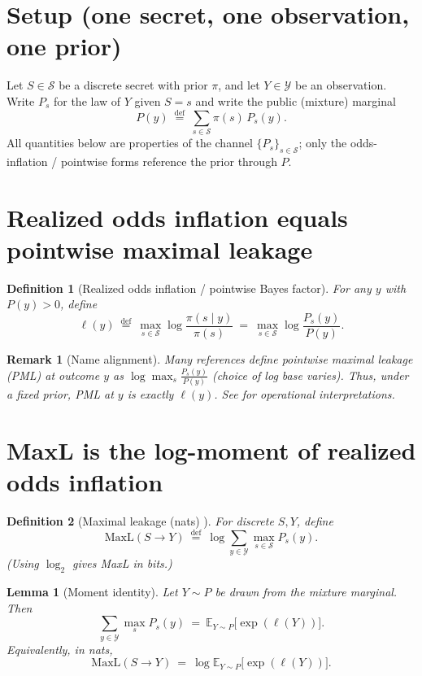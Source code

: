 \documentclass[11pt]{article}
\newcommand{\EE}{\mathbb{E}}
\newcommand{\defeq}{\stackrel{\mathrm{def}}{=}}
\newtheorem{definition}{Definition}
\newtheorem{lemma}{Lemma}
\newtheorem{remark}{Remark}
\begin{document}
\section{Setup (one secret, one observation, one prior)}
Let $S\in\mathcal S$ be a discrete secret with prior $\pi$, and let $Y\in\mathcal Y$ be an observation.
Write $P_s$ for the law of $Y$ given $S=s$ and write the public (mixture) marginal
\[
P(y)\ \defeq\ \sum_{s\in\mathcal S}\pi(s)\,P_s(y).
\]
All quantities below are properties of the channel $\{P_s\}_{s\in\mathcal S}$; only the odds-inflation / pointwise forms reference the prior through $P$.

\section{Realized odds inflation equals pointwise maximal leakage}

\begin{definition}[Realized odds inflation / pointwise Bayes factor]
For any $y$ with $P(y)>0$, define
\[
\ell(y)\ \defeq\ \max_{s\in\mathcal S}\log\frac{\pi(s\mid y)}{\pi(s)}
\ =\ \max_{s\in\mathcal S}\log\frac{P_s(y)}{P(y)}.
\]
\end{definition}

\begin{remark}[Name alignment]
Many references define \emph{pointwise maximal leakage} (PML) at outcome $y$ as
$\log\max_s \tfrac{P_s(y)}{P(y)}$ (choice of log base varies).
Thus, under a fixed prior, \emph{PML} at $y$ is exactly $\ell(y)$.
See \cite{saeidian2023pml} for operational interpretations.
\end{remark}

\section{MaxL is the log-moment of realized odds inflation}

\begin{definition}[Maximal leakage (nats) \cite{issa2020operational}]
For discrete $S,Y$, define
\[
\mathrm{MaxL}(S\to Y)\ \defeq\ \log\sum_{y\in\mathcal Y}\max_{s\in\mathcal S} P_s(y).
\]
(Using $\log_2$ gives MaxL in bits.)
\end{definition}

\begin{lemma}[Moment identity]
Let $Y\sim P$ be drawn from the mixture marginal.
Then
\[
\sum_{y\in\mathcal Y}\max_s P_s(y)\ =\ \EE_{Y\sim P}\big[\exp(\ell(Y))\big].
\]
Equivalently, in nats,
\[
\mathrm{MaxL}(S\to Y)\ =\ \log\EE_{Y\sim P}\big[\exp(\ell(Y))\big].
\]
\end{lemma}
\end{document}
